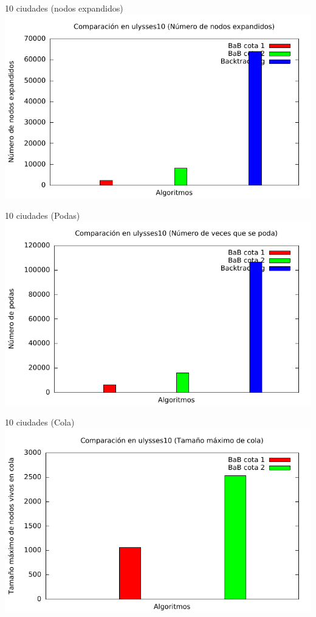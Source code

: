 \begin{frame}{10 ciudades (nodos expandidos)}
\includegraphics[width=\textwidth]{img/barras_ulysses10_nodos}
\end{frame}

\begin{frame}{10 ciudades (Podas)}
\includegraphics[width=\textwidth]{img/barras_ulysses10_poda}
\end{frame}

\begin{frame}{10 ciudades (Cola)}
\includegraphics[width=\textwidth]{img/barras_ulysses10_cola}
\end{frame}

